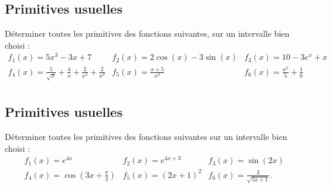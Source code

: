 
\newcommand{\mtn}{\mathbb{N}}
\newcommand{\mtns}{\mathbb{N}^*}
\newcommand{\mtz}{\mathbb{Z}}
\newcommand{\mtr}{\mathbb{R}}
\newcommand{\mtk}{\mathbb{K}}
\newcommand{\mtq}{\mathbb{Q}}
\newcommand{\mtc}{\mathbb{C}}
\newcommand{\mch}{\mathcal{H}}
\newcommand{\mcp}{\mathcal{P}}
\newcommand{\mcb}{\mathcal{B}}
\newcommand{\mcl}{\mathcal{L}}
\newcommand{\mcm}{\mathcal{M}}
\newcommand{\mcc}{\mathcal{C}}
\newcommand{\mcmn}{\mathcal{M}}
\newcommand{\mcmnr}{\mathcal{M}_n(\mtr)}
\newcommand{\mcmnk}{\mathcal{M}_n(\mtk)}
\newcommand{\mcsn}{\mathcal{S}_n}
\newcommand{\mcs}{\mathcal{S}}
\newcommand{\mcd}{\mathcal{D}}
\newcommand{\mcsns}{\mathcal{S}_n^{++}}
\newcommand{\glnk}{GL_n(\mtk)}
\newcommand{\mnr}{\mathcal{M}_n(\mtr)}
\newcommand{\veps}{\varepsilon}
\newcommand{\mcu}{\mathcal{U}}
\newcommand{\mcun}{\mcu_n}
\newcommand{\dis}{\displaystyle}
\newcommand{\croouv}{[\![}
\newcommand{\crofer}{]\!]}
\newcommand{\rab}{\mathcal{R}(a,b)}
\newcommand{\pss}[2]{\langle #1,#2\rangle}






\vspace{1em}

\subsection{Primitives usuelles}

Déterminer toutes les primitives des fonctions suivantes, sur un intervalle bien choisi : 
$$\begin{array}{lll}
\displaystyle f_1(x)=5x^3-3x+7&\displaystyle f_2(x)=2\cos(x)-3\sin(x)&\displaystyle f_3(x)=10-3e^x+x\\
\displaystyle f_4(x)=\frac{5}{\sqrt x}+\frac 4x+\frac{2}{x^2}+\frac{2}{x^3}&\displaystyle f_5(x)=\frac{x+5}{x^2}&\displaystyle f_6(x)=\frac{x^2}{5}+\frac 1{6}\\
\end{array}$$




\vspace{1em}
\subsection{Primitives usuelles}

Déterminer toutes les primitives des fonctions suivantes sur un intervalle bien choisi : 
$$\begin{array}{lll}
\displaystyle f_1(x)=e^{4x}&\displaystyle f_2(x)=e^{4x+3}& \displaystyle f_3(x)=\sin(2x)\\
\displaystyle f_4(x)=\cos\left(3x+\frac\pi 3\right)&
\displaystyle f_5(x)=(2x+1)^2&\displaystyle f_6(x)=\frac{3}{\sqrt{5x+1}}.
\end{array}$$



